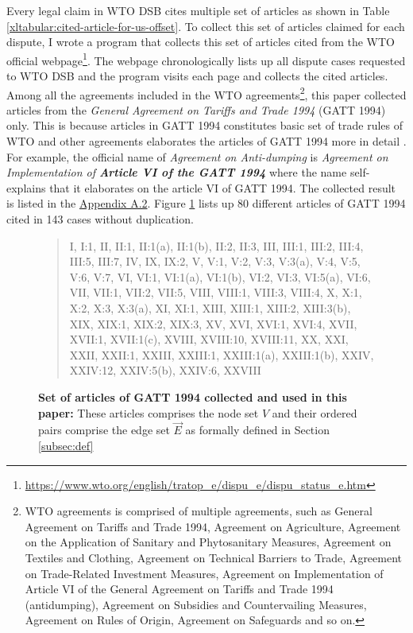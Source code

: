 Every legal claim in WTO DSB
cites multiple set of articles
as shown in Table
\ref{xltabular:cited-article-for-us-offset}.
To collect this set of articles claimed for each dispute, I wrote a program that collects this set of articles cited from the WTO official webpage\footnote{\url{https://www.wto.org/english/tratop_e/dispu_e/dispu_status_e.htm}}.
The webpage chronologically lists up all dispute cases
requested to WTO DSB and the program visits each page
and collects the cited articles. Among all the agreements included in the WTO agreements\footnote{
   WTO agreements is comprised of multiple agreements, such as
   General Agreement on Tariffs and Trade 1994,
   Agreement on Agriculture,
   Agreement on the Application of Sanitary and Phytosanitary Measures,
   Agreement on Textiles and Clothing,
   Agreement on Technical Barriers to Trade,
   Agreement on Trade-Related Investment Measures,
   Agreement on Implementation of Article VI of the General Agreement on Tariffs and Trade 1994 (antidumping),
   Agreement on Subsidies and Countervailing Measures,
   Agreement on Rules of Origin,
   Agreement on Safeguards and so on.
   },
this paper collected articles from the \textit{General Agreement on Tariffs and Trade 1994} (GATT 1994) only.
This is because articles in GATT 1994 constitutes basic set of trade rules of WTO and other agreements
elaborates the articles of GATT 1994 more in detail \citep{world1999wto}. For example, the official name of \textit{Agreement on Anti-dumping}
is \textit{Agreement on Implementation of \textbf{Article VI of the GATT 1994}}
where the name self-explains that it elaborates on the article VI of GATT 1994.
The collected result is listed in the \hyperref[sub:cited-articles-table]{Appendix A.2}. Figure \ref{fig:set-of-articles-used}
lists up 80 different articles of GATT 1994 cited in 143 cases without duplication.
 
 
\begin{figure}[t!]
   \begin{quote}
   I,
   I:1,
   II,
   II:1,
   II:1(a),
   II:1(b),
   II:2,
   II:3,
   III,
   III:1,
   III:2,
   III:4,
   III:5,
   III:7,
   IV,
   IX,
   IX:2,
   V,
   V:1,
   V:2,
   V:3,
   V:3(a),
   V:4,
   V:5,
   V:6,
   V:7,
   VI,
   VI:1,
   VI:1(a),
   VI:1(b),
   VI:2,
   VI:3,
   VI:5(a),
   VI:6,
   VII,
   VII:1,
   VII:2,
   VII:5,
   VIII,
   VIII:1,
   VIII:3,
   VIII:4,
   X,
   X:1,
   X:2,
   X:3,
   X:3(a),
   XI,
   XI:1,
   XIII,
   XIII:1,
   XIII:2,
   XIII:3(b),
   XIX,
   XIX:1,
   XIX:2,
   XIX:3,
   XV,
   XVI,
   XVI:1,
   XVI:4,
   XVII,
   XVII:1,
   XVII:1(c),
   XVIII,
   XVIII:10,
   XVIII:11,
   XX,
   XXI,
   XXII,
   XXII:1,
   XXIII,
   XXIII:1,
   XXIII:1(a),
   XXIII:1(b),
   XXIV,
   XXIV:12,
   XXIV:5(b),
   XXIV:6,
   XXVIII
   \end{quote}
   \caption{
       \textbf{
           Set of articles of GATT 1994 collected and used in this paper:
           }These articles comprises the node set $V$ and their ordered pairs comprise the edge set $\vec{E}$ as formally defined in Section \ref{subsec:def}
       }
   \label{fig:set-of-articles-used}
\end{figure}
  
